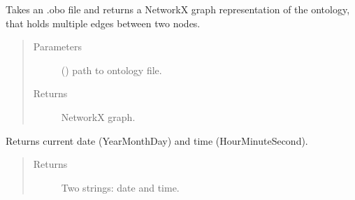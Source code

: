 \documentclass[letterpaper,10pt,english]{sphinxmanual}
\begin{document}

\begin{fulllineitems}
\label{\detokenize{_autosummary/graphdb_builder:graphdb_builder.builder_utils.convertOBOtoNet}}
Takes an .obo file and returns a NetworkX graph representation of the ontology, that holds multiple     edges between two nodes.
\begin{quote}\begin{description}
\item[{Parameters}] \leavevmode
{} () \textendash{} path to ontology file.

\item[{Returns}] \leavevmode
NetworkX graph.

\end{description}\end{quote}

\end{fulllineitems}


\begin{fulllineitems}
\label{\detokenize{_autosummary/graphdb_builder:graphdb_builder.builder_utils.getCurrentTime}}
Returns current date (Year\sphinxhyphen{}Month\sphinxhyphen{}Day) and time (Hour\sphinxhyphen{}Minute\sphinxhyphen{}Second).
\begin{quote}\begin{description}
\item[{Returns}] \leavevmode
Two strings: date and time.

\end{description}\end{quote}

\end{fulllineitems}

\end{document}
